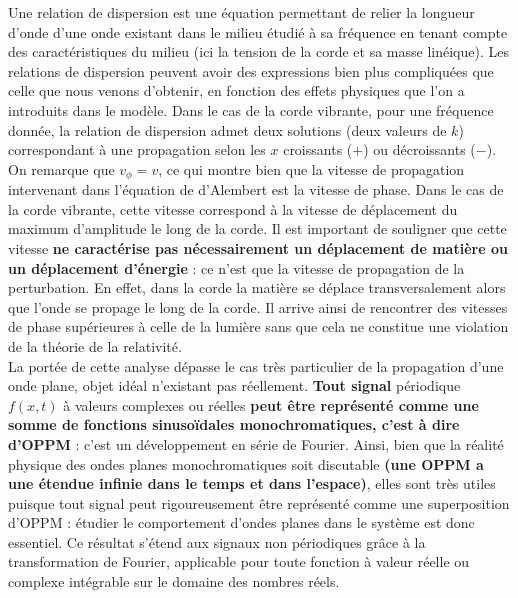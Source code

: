 \documentclass[11pt,a4paper]{report}
\begin{document}
Une relation de dispersion est une équation permettant de relier la longueur d'onde d'une onde existant dans le milieu étudié à sa fréquence en tenant compte des caractéristiques du milieu (ici la tension de la corde et sa masse linéique). Les relations de dispersion peuvent avoir des expressions bien plus compliquées que celle que nous venons d'obtenir, en fonction des effets physiques que l'on a introduits dans le modèle. Dans le cas de la corde vibrante, pour une fréquence donnée, la relation de dispersion admet deux solutions (deux valeurs de $k$) correspondant à une propagation selon les $x$ croissants ($+$) ou décroissants ($-$).\\

On remarque que $v_\phi = v$, ce qui montre bien que la vitesse de propagation intervenant dans l'équation de d'Alembert est la vitesse de phase. Dans le cas de la corde vibrante, cette vitesse correspond à la vitesse de déplacement du maximum d'amplitude le long de la corde. Il est important de souligner que cette vitesse \textbf{ne caractérise pas nécessairement un déplacement de matière ou un déplacement d'énergie} : ce n'est que la vitesse de propagation de la perturbation. En effet, dans la corde la matière se déplace transversalement alors que l'onde se propage le long de la corde. Il arrive ainsi de rencontrer des vitesses de phase supérieures à celle de la lumière sans que cela ne constitue une violation de la théorie de la relativité.\\

La portée de cette analyse dépasse le cas très particulier de la propagation d'une onde plane, objet idéal n'existant pas réellement. \textbf{Tout signal} périodique $f(x,t)$ à valeurs complexes ou réelles \textbf{peut être représenté comme une somme de fonctions sinusoïdales monochromatiques, c'est à dire d'OPPM} : c'est un développement en série de Fourier. Ainsi, bien que la réalité physique des ondes planes monochromatiques soit discutable \textbf{(une OPPM a une étendue infinie dans le temps et dans l'espace)}, elles sont très utiles puisque tout signal peut rigoureusement être représenté comme une superposition d'OPPM : étudier le comportement d'ondes planes dans le système est donc essentiel. Ce résultat s'étend aux signaux non périodiques grâce à la transformation de Fourier, applicable pour toute fonction à valeur réelle ou complexe intégrable sur le domaine des nombres réels. 
\end{document}
